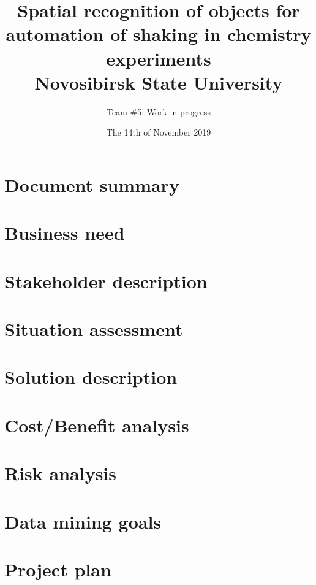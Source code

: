 \documentclass[14pt]{report}
\title{
	{Spatial recognition of objects for automation of shaking in chemistry experiments} \\
	{\large Novosibirsk State University} \\
}
\author{Team \#5: Work in progress}
\date{The 14th of November 2019}
\begin{document}
	
\maketitle
\tableofcontents


\chapter{Document summary}

\thispagestyle{fancy}


\chapter{Business need}

\thispagestyle{fancy}


\chapter{Stakeholder description}

\thispagestyle{fancy}


\chapter{Situation assessment}

\thispagestyle{fancy}


\chapter{Solution description}
\thispagestyle{fancy}


\chapter{Cost/Benefit analysis}

\thispagestyle{fancy}


\chapter{Risk analysis}

\thispagestyle{fancy}


\chapter{Data mining goals}

\thispagestyle{fancy}


\chapter{Project plan}

\thispagestyle{fancy}

\end{document}

